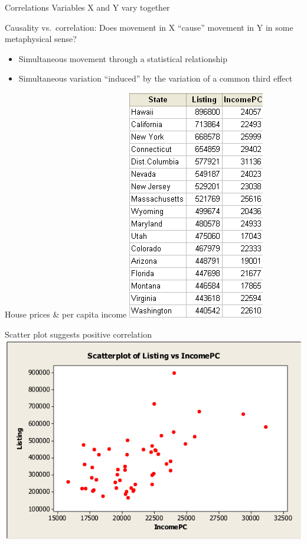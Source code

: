 \documentclass[aspectratio=169,usenames,dvipsnames]{beamer}
\begin{document}
\begin{frame}{Correlations}
Variables X and Y vary together

\begin{block}{Causality vs.\ correlation:}
Does movement in X ``cause''
movement in Y in some metaphysical sense?
\end{block}

\begin{description}[Correlation]
    \item[Correlation]
        \begin{itemize}
            \item Simultaneous movement through a statistical relationship
            \item Simultaneous variation ``induced'' by the variation of a
                common third effect
        \end{itemize}
    \end{description}
\end{frame}

\begin{frame}{House prices \& per capita income}
\includegraphics[height=0.85\textheight]{fig/housepricesincome}
\end{frame}

\begin{frame}{Scatter plot suggests positive correlation}
\includegraphics[height=0.7\textheight]{fig/incomelistingscatter}
\end{frame}
\end{document}
